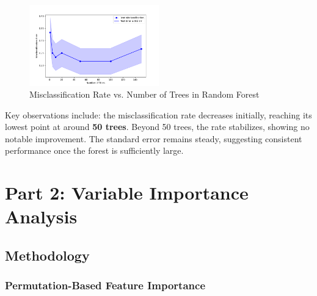 \documentclass[fleqn,moreauthors,10pt]{ds_report}
\begin{document}
\begin{figure}[h!]
    \centering
    \includegraphics[width=0.5\textwidth]{fig/misclassification_vs_trees}
    \caption{Misclassification Rate vs. Number of Trees in Random Forest}
    \label{fig:misclassification_plot}
\end{figure}
Key observations include: the misclassification rate decreases initially, reaching its lowest point at around \textbf{50 trees}. Beyond 50 trees, the rate stabilizes, showing no notable improvement. The standard error remains steady, suggesting consistent performance once the forest is sufficiently large.


\section*{Part 2: Variable Importance Analysis}

\subsection*{Methodology}

\subsubsection*{Permutation-Based Feature Importance}
\end{document}
